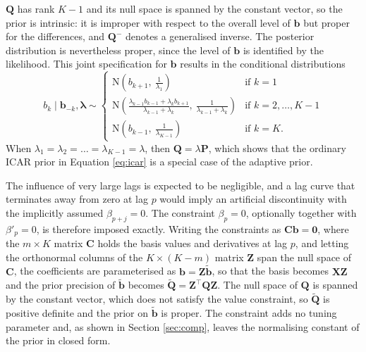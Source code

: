 \documentclass[11pt]{article}
\newcommand{\bb}{\mathbf{b}}
\newcommand{\bX}{\mathbf{X}}
\newcommand{\bP}{\mathbf{P}}
\newcommand{\bQ}{\mathbf{Q}}
\newcommand{\bZ}{\mathbf{Z}}
\newcommand{\bC}{\mathbf{C}}
\newcommand{\blambda}{\bm{\lambda}}
\newcommand{\bzero}{\mathbf{0}}
\newcommand{\N}{\mathrm{N}}
\begin{document}
$\bQ$ has rank $K - 1$ and its null space is spanned by the constant vector,
so the prior is intrinsic: it is improper with respect to the overall level of
$\bb$ but proper for the differences, and $\bQ^{-}$ denotes a generalised
inverse. The posterior distribution is nevertheless proper, since the level of
$\bb$ is identified by the likelihood. This joint specification for $\bb$
results in the conditional distributions
\begin{equation*}
b_k \mid \bb_{-k}, \blambda \sim
\begin{cases}
\N\left(b_{k+1},\ \frac{1}{\lambda_1}\right) & \text{if } k = 1 \\[6pt]
\N\left(\frac{\lambda_{k-1} b_{k-1} + \lambda_k b_{k+1}}{\lambda_{k-1} + \lambda_k},\
\frac{1}{\lambda_{k-1} + \lambda_k}\right) & \text{if } k = 2, \ldots, K-1 \\[6pt]
\N\left(b_{k-1},\ \frac{1}{\lambda_{K-1}}\right) & \text{if } k = K.
\end{cases}
\end{equation*}
When $\lambda_1 = \lambda_2 = \ldots = \lambda_{K-1} = \lambda$, then $\bQ =
\lambda \bP$, which shows that the ordinary ICAR prior in Equation
\eqref{eq:icar} is a special case of the adaptive prior.

The influence of very large lags is expected to be negligible, and a lag
curve that terminates away from zero at lag $p$ would imply an artificial
discontinuity with the implicitly assumed $\beta_{p+j} = 0$. The constraint
$\beta_p = 0$, optionally together with $\beta'_p = 0$, is therefore imposed
exactly. Writing the constraints as $\bC \bb = \bzero$, where the $m \times
K$ matrix $\bC$ holds the basis values and derivatives at lag $p$, and
letting the orthonormal columns of the $K \times (K - m)$ matrix $\bZ$ span
the null space of $\bC$, the coefficients are parameterised as $\bb = \bZ
\tilde{\bb}$, so that the basis becomes $\bX \bZ$ and the prior precision of
$\tilde{\bb}$ becomes $\tilde{\bQ} = \bZ^\top \bQ \bZ$. The null space of
$\bQ$ is spanned by the constant vector, which does not satisfy the value
constraint, so $\tilde{\bQ}$ is positive definite and the prior on
$\tilde{\bb}$ is proper. The constraint adds no tuning parameter and, as
shown in Section \ref{sec:comp}, leaves the normalising constant of the prior
in closed form.
\end{document}
